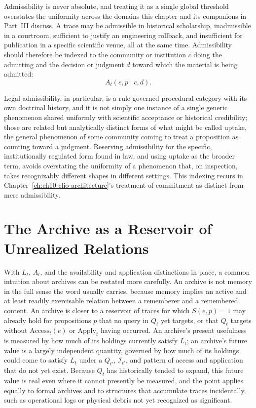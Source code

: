 Admissibility is never absolute, and treating it as a single global threshold overstates the uniformity across the domains this chapter and its companions in Part~III discuss. A trace may be admissible in historical scholarship, inadmissible in a courtroom, sufficient to justify an engineering rollback, and insufficient for publication in a specific scientific venue, all at the same time. Admissibility should therefore be indexed to the community or institution $c$ doing the admitting and the decision or judgment $d$ toward which the material is being admitted:
\[
A_t(e,p \mid c, d).
\]

Legal admissibility, in particular, is a rule-governed procedural category with its own doctrinal history, and it is not simply one instance of a single generic phenomenon shared uniformly with scientific acceptance or historical credibility; those are related but analytically distinct forms of what might be called uptake, the general phenomenon of some community coming to treat a proposition as counting toward a judgment. Reserving admissibility for the specific, institutionally regulated form found in law, and using uptake as the broader term, avoids overstating the uniformity of a phenomenon that, on inspection, takes recognizably different shapes in different settings. This indexing recurs in Chapter~\ref{ch:ch10-clio-architecture}'s treatment of commitment as distinct from mere admissibility.

\section{The Archive as a Reservoir of Unrealized Relations}

With $L_t$, $A_t$, and the availability and application distinctions in place, a common intuition about archives can be restated more carefully. An archive is not memory in the full sense the word usually carries, because memory implies an active and at least readily exercisable relation between a rememberer and a remembered content. An archive is closer to a reservoir of traces for which $S(e,p)=1$ may already hold for propositions $p$ that no query in $Q_t$ yet targets, or that $Q_t$ targets without $\mathrm{Access}_t(e)$ or $\mathrm{Apply}_t$ having occurred. An archive's present usefulness is measured by how much of its holdings currently satisfy $L_t$; an archive's future value is a largely independent quantity, governed by how much of its holdings could come to satisfy $L_t$ under a $Q_{t'}$, $\mathcal{I}_{t'}$, and pattern of access and application that do not yet exist. Because $Q_t$ has historically tended to expand, this future value is real even where it cannot presently be measured, and the point applies equally to formal archives and to structures that accumulate traces incidentally, such as operational logs or physical debris not yet recognized as significant.

